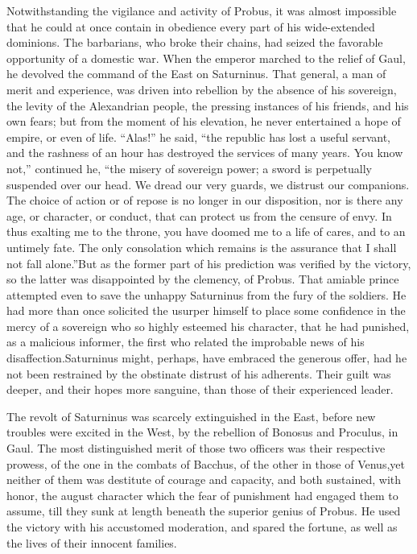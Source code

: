 Notwithstanding the vigilance and activity of Probus, it was
almost impossible that he could at once contain in obedience
every part of his wide-extended dominions. The barbarians, who
broke their chains, had seized the favorable opportunity of a
domestic war. When the emperor marched to the relief of Gaul, he
devolved the command of the East on Saturninus. That general, a
man of merit and experience, was driven into rebellion by the
absence of his sovereign, the levity of the Alexandrian people,
the pressing instances of his friends, and his own fears; but
from the moment of his elevation, he never entertained a hope of
empire, or even of life. “Alas!” he said, “the republic has lost
a useful servant, and the rashness of an hour has destroyed the
services of many years. You know not,” continued he, “the misery
of sovereign power; a sword is perpetually suspended over our
head. We dread our very guards, we distrust our companions. The
choice of action or of repose is no longer in our disposition,
nor is there any age, or character, or conduct, that can protect
us from the censure of envy. In thus exalting me to the throne,
you have doomed me to a life of cares, and to an untimely fate.
The only consolation which remains is the assurance that I shall
not fall alone.”\footnotemark[51] But as the former part of his prediction was
verified by the victory, so the latter was disappointed by the
clemency, of Probus. That amiable prince attempted even to save
the unhappy Saturninus from the fury of the soldiers. He had more
than once solicited the usurper himself to place some confidence
in the mercy of a sovereign who so highly esteemed his character,
that he had punished, as a malicious informer, the first who
related the improbable news of his disaffection.\footnotemark[52] Saturninus
might, perhaps, have embraced the generous offer, had he not been
restrained by the obstinate distrust of his adherents. Their
guilt was deeper, and their hopes more sanguine, than those of
their experienced leader.



The revolt of Saturninus was scarcely extinguished in the East,
before new troubles were excited in the West, by the rebellion of
Bonosus and Proculus, in Gaul. The most distinguished merit of
those two officers was their respective prowess, of the one in
the combats of Bacchus, of the other in those of Venus,\footnotemark[53] yet
neither of them was destitute of courage and capacity, and both
sustained, with honor, the august character which the fear of
punishment had engaged them to assume, till they sunk at length
beneath the superior genius of Probus. He used the victory with
his accustomed moderation, and spared the fortune, as well as the
lives of their innocent families.\footnotemark[54]

